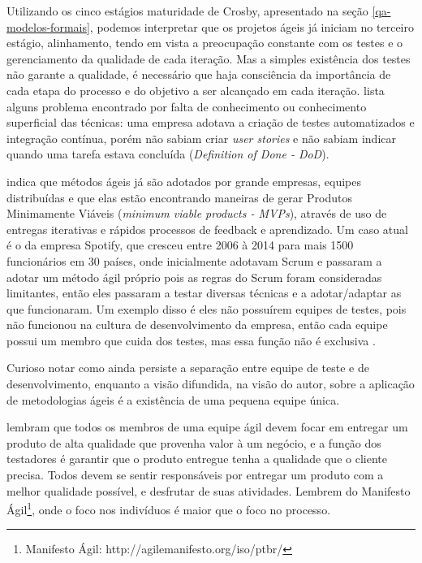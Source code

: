\documentclass[
	12pt,				%
	openright,			%
	oneside,			%
	a4paper,			%
	english,			%
	brazil,				%
	]{abntex2}
\begin{document}
Utilizando os cinco estágios maturidade de Crosby, apresentado na seção \autoref{qa-modelos-formais}, podemos interpretar que os projetos ágeis já iniciam no terceiro estágio, alinhamento, tendo em vista a preocupação constante com os testes e o gerenciamento da qualidade de cada iteração. Mas a simples existência dos testes não garante a qualidade, é necessário que haja consciência da importância de cada etapa do processo e do objetivo a ser alcançado em cada iteração.  lista alguns problema encontrado por falta de conhecimento ou conhecimento superficial das técnicas: uma empresa adotava a criação de testes automatizados e integração contínua, porém não sabiam criar \emph{user stories} e não sabiam indicar quando uma tarefa estava concluída (\emph{Definition of Done - DoD}). %

 indica que métodos ágeis já são adotados por grande empresas, equipes distribuídas e que elas estão encontrando maneiras de gerar Produtos Minimamente Viáveis (\emph{minimum viable products - MVPs}), através de uso de entregas iterativas e rápidos processos de feedback e aprendizado. Um caso atual é o da empresa Spotify, que cresceu entre 2006 à 2014 para mais 1500 funcionários em 30 países, onde inicialmente adotavam Scrum e passaram a adotar um método ágil próprio pois as regras do Scrum foram consideradas limitantes, então eles passaram a testar diversas técnicas e a adotar/adaptar as que funcionaram. Um exemplo disso é eles não possuírem equipes de testes, pois não funcionou na cultura de desenvolvimento da empresa, então cada equipe possui um membro que cuida dos testes, mas essa função não é exclusiva \cite{spotify2014}. %

Curioso notar como ainda persiste a separação entre equipe de teste e de desenvolvimento, enquanto a visão difundida, na visão do autor, sobre a aplicação de metodologias ágeis é a existência de uma pequena equipe única.

 lembram que todos os membros de uma equipe ágil devem focar em entregar um produto de alta qualidade que provenha valor à um negócio, e a função dos testadores é garantir que o produto entregue tenha a qualidade que o cliente precisa. Todos devem se sentir responsáveis por entregar um produto com a melhor qualidade possível, e desfrutar de suas atividades. Lembrem do Manifesto Ágil\footnote{Manifesto Ágil: http://agilemanifesto.org/iso/ptbr/}, onde o foco nos indivíduos é maior que o foco no processo.%
\end{document}
